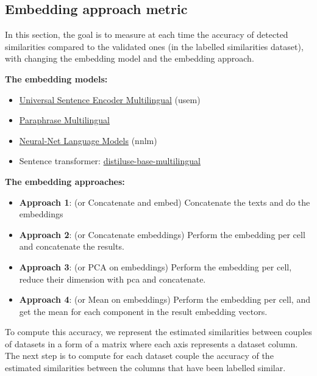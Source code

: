
\subsection{Embedding approach metric}
In this section, the goal is to measure at each time the accuracy of detected
similarities compared to the validated ones (in the labelled similarities
dataset), with changing the embedding model and the embedding approach.

\begin{multicols}{2}
    \textbf{The embedding models:}
    \begin{itemize}
        \item \href{https://tfhub.dev/google/universal-sentence-encoder/4}
              {Universal Sentence Encoder Multilingual} (\acrshort{usem})
        \item
              \href{https://huggingface.co/sentence-transformers/paraphrase-multilingual-MiniLM-L12-v2}
              {Paraphrase Multilingual}
        \item
              \href{https://tfhub.dev/google/nnlm-en-dim50-with-normalization/2}
              {Neural-Net Language Models} (\acrshort{nnlm})
        \item Sentence transformer:
              \href{https://huggingface.co/sentence-transformers/distiluse-base-multilingual-cased-v2}
              {distiluse-base-multilingual}
    \end{itemize}
    \columnbreak
    \textbf{The embedding approaches:}
    \begin{itemize}
        \item \textbf{Approach 1}: (or Concatenate and embed) Concatenate the texts and do the embeddings
        \item \textbf{Approach 2}: (or Concatenate embeddings) Perform the embedding per cell and concatenate the results.
        \item \textbf{Approach 3}: (or PCA on embeddings) Perform the embedding per cell, reduce their dimension with
              \acrshort{pca} and concatenate.
        \item \textbf{Approach 4}: (or Mean on embeddings) Perform the embedding per cell, and get the mean for each
              component in the result embedding vectors.
    \end{itemize}
\end{multicols}

To compute this accuracy, we represent the estimated similarities between couples
of datasets in a form of a matrix where each axis represents a dataset column. The
next step is to compute for each dataset couple the accuracy of the estimated
similarities between the columns that have been labelled similar.

